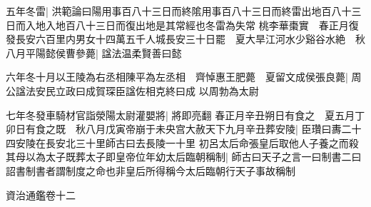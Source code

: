 五年冬雷|{
	洪範論曰陽用事百八十三日而終隂用事百八十三日而終雷出地百八十三日而入地入地百八十三日而復出地是其常經也冬雷為失常}
桃李華棗實　春正月復發長安六百里内男女十四萬五千人城長安三十日罷　夏大旱江河水少谿谷水絶　秋八月平陽懿侯曹參薨|{
	諡法温柔賢善曰懿}


六年冬十月以王陵為右丞相陳平為左丞相　齊悼惠王肥薨　夏留文成侯張良薨|{
	周公諡法安民立政曰成賀琛臣諡佐相克終曰成}
以周勃為太尉

七年冬發車騎材官詣滎陽太尉灌嬰將|{
	將即亮翻}
春正月辛丑朔日有食之　夏五月丁卯日有食之既　秋八月戊寅帝崩于未央宫大赦天下九月辛丑葬安陵|{
	臣瓚曰夀二十四安陵在長安北三十里師古曰去長陵一十里}
初呂太后命張皇后取他人子養之而殺其母以為太子既葬太子即皇帝位年幼太后臨朝稱制|{
	師古曰天子之言一曰制書二曰詔書制書者謂制度之命也非皇后所得稱今太后臨朝行天子事故稱制}


資治通鑑卷十二
